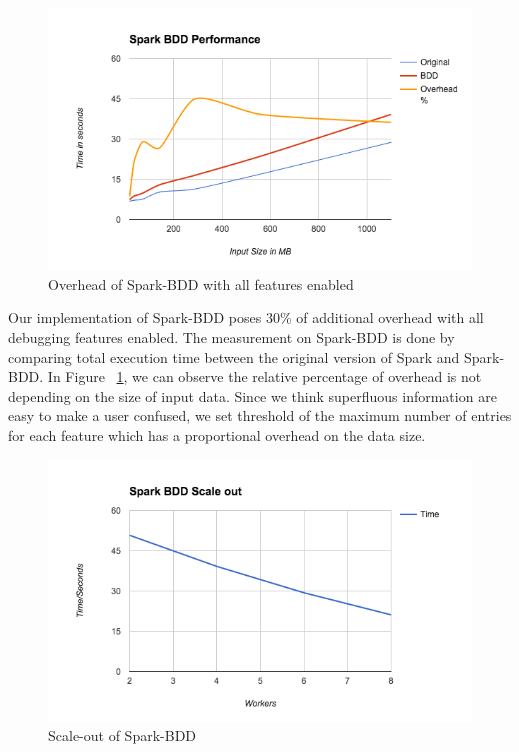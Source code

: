 \documentclass{acm_proc_article-sp}
\begin{document}
\begin{figure}[ht]
    \begin{minipage}[b]{\linewidth}
        \includegraphics[width=\textwidth]{spark-bdd-performance.png}
        \caption{Overhead of Spark-BDD with all features enabled}
        \label{fig:overhead}
    \end{minipage}
\end{figure}
Our implementation of Spark-BDD poses 30\% of additional overhead with all debugging features enabled. The measurement on Spark-BDD is done by comparing total execution time between the original version of Spark and Spark-BDD. In Figure ~\ref{fig:overhead}, we can observe the relative percentage of overhead is not depending on the size of input data. Since we think superfluous information are easy to make a user confused, we set threshold of the maximum number of entries for each feature which has a proportional overhead on the data size.\\
\begin{figure}[ht]
    \begin{minipage}[b]{\linewidth}
        \includegraphics[width=\textwidth]{spark-bdd-scale-out.png}
        \caption{Scale-out of Spark-BDD}
        \label{fig:scaleout}
    \end{minipage}
\end{figure}
\end{document}
